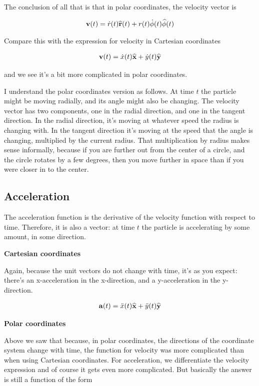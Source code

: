 The conclusion of all that is that in polar coordinates, the velocity vector is

\begin{align*}
\mathbf v(t) = \dot r(t) \mathbf{\widehat{r}}(t) + r(t) \dot \phi(t) \mathbf{\widehat{\phi}}(t)
\end{align*}

Compare this with the expression for velocity in Cartesian coordinates

\begin{align*}
\mathbf v(t) =  \dot x(t) \mathbf{\widehat{x}} + \dot y(t) \mathbf{\widehat{y}}
\end{align*}

and we see it's a bit more complicated in polar coordinates.

I understand the polar coordinates version as follows. At time $t$ the particle
might be moving radially, and its angle might also be changing. The velocity
vector has two components, one in the radial direction, and one in the tangent
direction. In the radial direction, it's moving at whatever speed the radius is
changing with. In the tangent direction it's moving at the speed that the angle
is changing, multiplied by the current radius. That multiplication by radius
makes sense informally, because if you are further out from the center of a
circle, and the circle rotates by a few degrees, then you move further in space
than if you were closer in to the center.


\subsection{Acceleration}


The acceleration function is the derivative of the velocity function with
respect to time. Therefore, it is also a vector: at time $t$ the particle is
accelerating by some amount, in some direction.

\textbf{Cartesian coordinates}

Again, because the unit vectors do not change with time, it's as you expect:
there's an x-acceleration in the x-direction, and a y-acceleration in the
y-direction.

\begin{align*}
\mathbf{a}(t) = \ddot x(t) \mathbf{\widehat{x}} + \ddot y(t) \mathbf{\widehat{y}}
\end{align*}

\textbf{Polar coordinates}

Above we saw that because, in polar coordinates, the directions of the
coordinate system change with time, the function for velocity was more
complicated than when using Cartesian coordinates. For acceleration, we
differentiate the velocity expression and of course it gets even more
complicated. But basically the answer is still a function of the form

